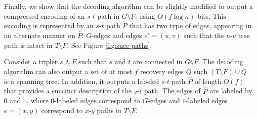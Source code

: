%
Finally, we show that the decoding algorithm can be slightly modified to output a compressed encoding of an $s$-$t$ path in $G \setminus F$, using $O(f\log n)$ bits. This encoding is represented by an $s$-$t$ path $\widehat{P}$ that has two type of edges, appearing in an alternate manner on  $\widehat{P}$: $G$-edges and edges $e'=(u,v)$ such that the $u$-$v$ tree path is intact in $T \setminus F$. See Figure \ref{fig:succ-paths}. 
\begin{lemma}\label{lem:useful-recovery-edges}
Consider a triplet $s,t,F$ such that $s$ and $t$ are connected in $G \setminus F$. 
The decoding algorithm can also output a set of at most $f$ recovery edges $Q$ such $(T \setminus F) \cup Q$ is a spanning tree. In addition, it outputs a labeled $s$-$t$ path $\widehat{P}$ of length $O(f)$ that provides a succinct description of the $s$-$t$ path. The edges of $\widehat{P}$ are labeled by $0$ and $1$, where $0$-labeled edges correspond to $G$-edges and $1$-labeled edges $e=(x,y)$ correspond to $x$-$y$ paths in $T \setminus F$. 
\end{lemma}
